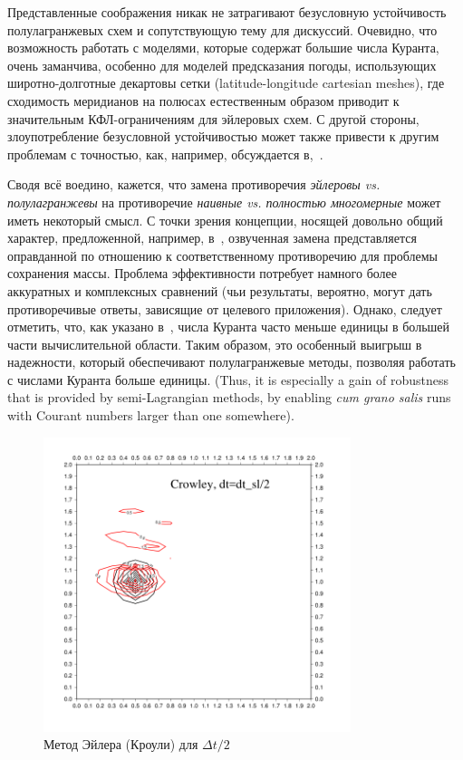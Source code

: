 Представленные соображения никак не затрагивают безусловную устойчивость полулагранжевых схем и сопутствующую тему для дискуссий. Очевидно, что возможность работать с моделями, которые содержат большие числа Куранта, очень заманчива, особенно для моделей предсказания погоды, использующих широтно-долготные декартовы сетки (latitude-longitude cartesian meshes), где сходимость меридианов на полюсах естественным образом приводит к значительным КФЛ-ограничениям для эйлеровых схем. С другой стороны, злоупотребление безусловной устойчивостью может также привести к другим проблемам с точностью, как, например, обсуждается в\cite{A2},~\cite{A26}.

Сводя всё воедино, кажется, что замена противоречия \textit{эйлеровы vs. полулагранжевы} на противоречие \textit{наивные vs. полностью многомерные} может иметь некоторый смысл. С точки зрения концепции, носящей довольно общий характер, предложенной, например, в~\cite{A43}, озвученная замена представляется оправданной по отношению к соответственному противоречию для проблемы сохранения массы. Проблема эффективности потребует намного более аккуратных и комплексных сравнений (чьи результаты, вероятно, могут дать противоречивые ответы, зависящие от целевого приложения). Однако, следует отметить, что, как указано в~\cite{A26}, числа Куранта часто меньше единицы в большей части вычислительной области. Таким образом, это особенный выигрыш в надежности, который обеспечивают полулагранжевые методы, позволяя работать с числами Куранта больше единицы. (Thus, it is especially a gain of robustness that is provided by semi-Lagrangian methods, by enabling \textit{cum grano salis} runs with Courant numbers larger than one somewhere).
%
\begin{figure}[ht] 
	\centering
	\includegraphics[width=0.8\textwidth,height=0.8\textwidth]{images/6_9}
	\caption{Метод Эйлера (Кроули) для $\Delta t/2$}
	\label{img:6_9}
\end{figure}
